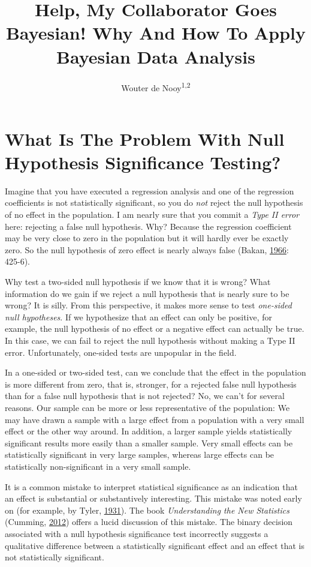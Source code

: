 \documentclass[doc]{apa6}
\title{Help, My Collaborator Goes Bayesian! Why And How To Apply Bayesian Data
Analysis}
\author{Wouter de Nooy\textsuperscript{1,2}}
\date{}
\affiliation{
\vspace{0.5cm}
\textsuperscript{1} Amsterdam School of Communication Research ASCor\\\textsuperscript{2} University of Amsterdam}
\begin{document}
\maketitle

\section{What Is The Problem With Null Hypothesis Significance
Testing?}\label{what-is-the-problem-with-null-hypothesis-significance-testing}

Imagine that you have executed a regression analysis and one of the
regression coefficients is not statistically significant, so you do
\emph{not} reject the null hypothesis of no effect in the population. I
am nearly sure that you commit a \emph{Type II error} here: rejecting a
false null hypothesis. Why? Because the regression coefficient may be
very close to zero in the population but it will hardly ever be exactly
zero. So the null hypothesis of zero effect is nearly always false
(Bakan,
\protect\hyperlink{ref-bakanTestSignificancePsychological1966}{1966}:
425-6).

Why test a two-sided null hypothesis if we know that it is wrong? What
information do we gain if we reject a null hypothesis that is nearly
sure to be wrong? It is silly. From this perspective, it makes more
sense to test \emph{one-sided null hypotheses}. If we hypothesize that
an effect can only be positive, for example, the null hypothesis of no
effect or a negative effect can actually be true. In this case, we can
fail to reject the null hypothesis without making a Type II error.
Unfortunately, one-sided tests are unpopular in the field.

In a one-sided or two-sided test, can we conclude that the effect in the
population is more different from zero, that is, stronger, for a
rejected false null hypothesis than for a false null hypothesis that is
not rejected? No, we can't for several reasons. Our sample can be more
or less representative of the population: We may have drawn a sample
with a large effect from a population with a very small effect or the
other way around. In addition, a larger sample yields statistically
significant results more easily than a smaller sample. Very small
effects can be statistically significant in very large samples, whereas
large effects can be statistically non-significant in a very small
sample.

It is a common mistake to interpret statistical significance as an
indication that an effect is substantial or substantively interesting.
This mistake was noted early on (for example, by Tyler,
\protect\hyperlink{ref-tylerWhatStatisticalSignificance1931}{1931}). The
book \emph{Understanding the New Statistics} (Cumming,
\protect\hyperlink{ref-CummingUnderstandingnewstatistics2012}{2012})
offers a lucid discussion of this mistake. The binary decision
associated with a null hypothesis significance test incorrectly suggests
a qualitative difference between a statistically significant effect and
an effect that is not statistically significant.
\end{document}
